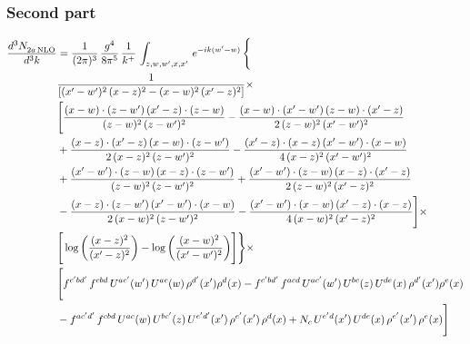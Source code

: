 \documentclass[9pt]{article}
\numberwithin{equation}{section}
\begin{document}
\subsubsection{Second part}
\begin{align}
    \frac{d^{3}N_{2a\,\rm NLO}^{\rm}}{d^{3}k}  & =  \frac{1}{(2\pi)^{3}}\, \frac{g^{4}}{8\pi^{5}}\,\frac{1}{k^{+}}\,\int_{z,w,w^{\prime},x,x'}\, e^{-ik(w^{\prime}-w)}\, \Bigg\{\notag \\
& \frac{1}{\left[(x'-w')^{2}\, (x-z)^{2}-(x-w)^{2}\, (x'-z)^{2}\right]}\times\,\notag \\ & \Bigg[\frac{(x-w)\cdot (z-w')\, (x'-z)\cdot (z-w)}{(z-w)^{2}\,(z-w')^{2}}-\frac{(x-w)\cdot (x'-w')\, (z-w)\cdot (x'-z)}{2\, (z-w)^{2}\, (x'-w')^{2}}\notag \\ & + \frac{(x-z)\cdot (x'-z)\, (x-w)\cdot (z-w')}{2\, (x-z)^{2}\, (z-w')^{2}}-\frac{(x'-z)\cdot (x-z)\, (x'-w')\cdot (x-w)}{4\, (x-z)^{2}\, (x'-w')^{2}}\notag \\ & + \frac{(x'-w')\cdot (z-w)\, (x-z)\cdot (z-w')}{(z-w)^{2}\,(z-w')^{2}}+\frac{(x'-w')\cdot (z-w)\, (x-z)\cdot (x'-z)}{2\, (z-w)^{2}\, (x'-z)^{2}}\notag \\ & - \frac{(x-z)\cdot (z-w')\, (x'-w')\cdot (x-w)}{2\, (x-w)^{2}\, (z-w')^{2}} -\frac{(x'-w')\cdot (x-w)\, (x'-z)\cdot (x-z)}{4\, (x-w)^{2}\, (x'-z)^{2}}\Bigg]\times\notag \\ &  \Bigg[\log{\left(\frac{(x-z)^{2}}{(x'-z)^{2}}\right)}-\log{\left(\frac{(x-w)^{2}}{(x'-w')^{2}}\right)}\Bigg]\Bigg\} \times\, \notag \\ & \Bigg[f^{c'bd'}\,f^{cbd}\, U^{ac'}(w')\,U^{ac}(w)\,\rho^{d'}(x')\rho^{d}(x)- f^{c'bd'}\,f^{acd}\,U^{ac'}(w')\,U^{bc}(z)\,U^{de}(x)\,\rho^{d'}(x')\rho^{e}(x) \notag \\ & -f^{ac'd'}\,f^{cbd}\,U^{ac}(w)\,U^{bc'}(z)\,U^{e'd'}(x')\,\rho^{e'}(x')\,\rho^{d}(x) +N_{c}\,U^{e'd}(x')\,U^{de}(x)\,\rho^{e'}(x')\,\rho^{e}(x)\Bigg]
\end{align}
\end{document}
